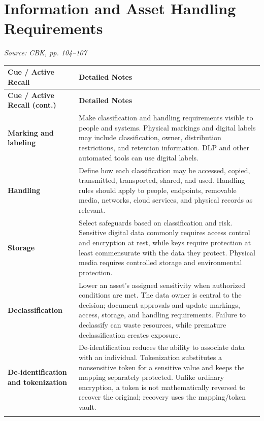 \documentclass[10pt,letterpaper]{article}
\makeatletter
\newenvironment{cornell}
{\rowcolors{2}{white}{notebg}\begin{longtable}{@{}>{\raggedright\arraybackslash\columncolor{cuebg}\color{navy}\bfseries}p{0.285\textwidth}>{\raggedright\arraybackslash}p{0.65\textwidth}@{}}
\rowcolor{navy}\color{white}\textbf{Cue / Active Recall} & \color{white}\textbf{Detailed Notes}\\ \hline\endfirsthead
\rowcolor{navy}\color{white}\textbf{Cue / Active Recall (cont.)} & \color{white}\textbf{Detailed Notes}\\ \hline\endhead}{\end{longtable}}
\newcommand{\noterow}[2]{#1 & #2\\\arrayrulecolor{line}\hline}
\newcommand{\source}[1]{\par{\footnotesize\color{teal}\textit{Source: CBK, #1}}\par}
\makeatother
\begin{document}
\section{\color{navy}Information and Asset Handling Requirements}
\source{pp. 104--107}
\begin{cornell}
\noterow{Marking and labeling}{Make classification and handling requirements visible to people and systems. Physical markings and digital labels may include classification, owner, distribution restrictions, and retention information. DLP and other automated tools can use digital labels.}
\noterow{Handling}{Define how each classification may be accessed, copied, transmitted, transported, shared, and used. Handling rules should apply to people, endpoints, removable media, networks, cloud services, and physical records as relevant.}
\noterow{Storage}{Select safeguards based on classification and risk. Sensitive digital data commonly requires access control and encryption at rest, while keys require protection at least commensurate with the data they protect. Physical media requires controlled storage and environmental protection.}
\noterow{Declassification}{Lower an asset's assigned sensitivity when authorized conditions are met. The data owner is central to the decision; document approvals and update markings, access, storage, and handling requirements. Failure to declassify can waste resources, while premature declassification creates exposure.}
\noterow{De-identification and tokenization}{De-identification reduces the ability to associate data with an individual. Tokenization substitutes a nonsensitive token for a sensitive value and keeps the mapping separately protected. Unlike ordinary encryption, a token is not mathematically reversed to recover the original; recovery uses the mapping/token vault.}
\end{cornell}
\end{document}
